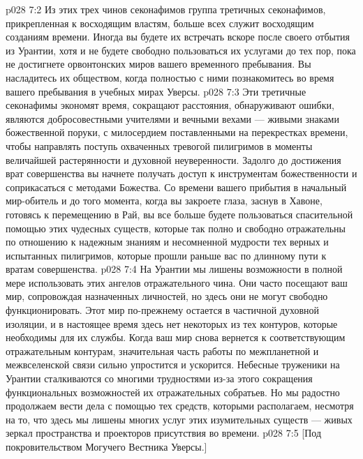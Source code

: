 \vs p028 7:2 \pc Из этих трех чинов секонафимов группа третичных секонафимов, прикрепленная к восходящим властям, больше всех служит восходящим созданиям времени. Иногда вы будете их встречать вскоре после своего отбытия из Урантии, хотя и не будете свободно пользоваться их услугами до тех пор, пока не достигнете орвонтонских миров вашего временного пребывания. Вы насладитесь их обществом, когда полностью с ними познакомитесь во время вашего пребывания в учебных мирах Уверсы.
\vs p028 7:3 Эти третичные секонафимы экономят время, сокращают расстояния, обнаруживают ошибки, являются добросовестными учителями и вечными вехами --- живыми знаками божественной поруки, с милосердием поставленными на перекрестках времени, чтобы направлять поступь охваченных тревогой пилигримов в моменты величайшей растерянности и духовной неуверенности. Задолго до достижения врат совершенства вы начнете получать доступ к инструментам божественности и соприкасаться с методами Божества. Со времени вашего прибытия в начальный мир\hyp{}обитель и до того момента, когда вы закроете глаза, заснув в Хавоне, готовясь к перемещению в Рай, вы все больше будете пользоваться спасительной помощью этих чудесных существ, которые так полно и свободно отражательны по отношению к надежным знаниям и несомненной мудрости тех верных и испытанных пилигримов, которые прошли раньше вас по длинному пути к вратам совершенства.
\vs p028 7:4 На Урантии мы лишены возможности в полной мере использовать этих ангелов отражательного чина. Они часто посещают ваш мир, сопровождая назначенных личностей, но здесь они не могут свободно функционировать. Этот мир по\hyp{}прежнему остается в частичной духовной изоляции, и в настоящее время здесь нет некоторых из тех контуров, которые необходимы для их службы. Когда ваш мир снова вернется к соответствующим отражательным контурам, значительная часть работы по межпланетной и межвселенской связи сильно упростится и ускорится. Небесные труженики на Урантии сталкиваются со многими трудностями из\hyp{}за этого сокращения функциональных возможностей их отражательных собратьев. Но мы радостно продолжаем вести дела с помощью тех средств, которыми располагаем, несмотря на то, что здесь мы лишены многих услуг этих изумительных существ --- живых зеркал пространства и проекторов присутствия во времени.
\vsetoff
\vs p028 7:5 [Под покровительством Могучего Вестника Уверсы.]
